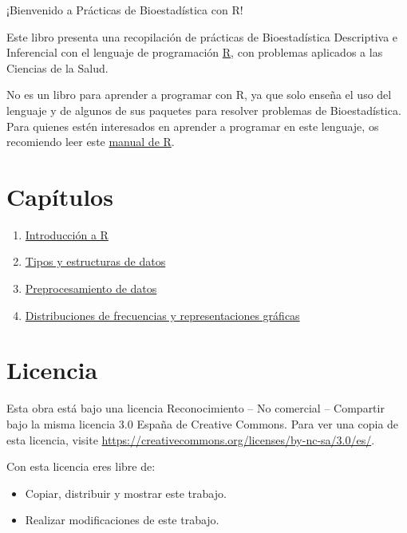 \documentclass[
  spanish,
  a4paper,
]{scrreport}
\providecommand{\tightlist}{%
  \setlength{\itemsep}{0pt}\setlength{\parskip}{0pt}}
\theoremstyle{definition}
\theoremstyle{remark}
\begin{document}

¡Bienvenido a Prácticas de Bioestadística con R!

Este libro presenta una recopilación de prácticas de Bioestadística
Descriptiva e Inferencial con el lenguaje de programación
\href{https://www.r-project.org/}{R}, con problemas aplicados a las
Ciencias de la Salud.

No es un libro para aprender a programar con R, ya que solo enseña el
uso del lenguaje y de algunos de sus paquetes para resolver problemas de
Bioestadística. Para quienes estén interesados en aprender a programar
en este lenguaje, os recomiendo leer este
\href{https://aprendeconalf.es/manual-r/}{manual de R}.

\section*{Capítulos}\label{capuxedtulos}


\begin{enumerate}
\def\labelenumi{\arabic{enumi}.}
\tightlist
\item
  \href{./01-intro.qmd}{Introducción a R}
\item
  \href{02-tipos-datos.qmd}{Tipos y estructuras de datos}
\item
  \href{03-preprocesamiento-datos.qmd}{Preprocesamiento de datos}
\item
  \href{04-frecuencias-graficos.qmd}{Distribuciones de frecuencias y
  representaciones gráficas}
\end{enumerate}

\section*{Licencia}\label{licencia}


Esta obra está bajo una licencia Reconocimiento -- No comercial --
Compartir bajo la misma licencia 3.0 España de Creative Commons. Para
ver una copia de esta licencia, visite
\url{https://creativecommons.org/licenses/by-nc-sa/3.0/es/}.

Con esta licencia eres libre de:

\begin{itemize}
\tightlist
\item
  Copiar, distribuir y mostrar este trabajo.
\item
  Realizar modificaciones de este trabajo.
\end{itemize}
\end{document}
